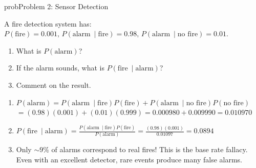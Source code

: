 \begin{PSbox}[unbreakable]{prob}{Problem 2: Sensor Detection}

A fire detection system has: $P(\text{fire}) = 0.001,\, P(\text{alarm}\ \mid \text{fire}) = 0.98,\, P(\text{alarm}\ \mid \text{no fire}) = 0.01$.

\begin{enumerate}
\def\labelenumi{(\alph{enumi})}
\tightlist
\item
  What is $P(\text{alarm})$?
\item
  If the alarm sounds, what is $P(\text{fire}\ \mid \text{alarm})$?
\item
  Comment on the result.
\end{enumerate}

\PSsolution{} 

\begin{enumerate}
\def\labelenumi{(\alph{enumi})}
\item
  $P(\text{alarm}) = P(\text{alarm}\ \mid \text{fire})P(\text{fire}) + P(\text{alarm}\ \mid \text{no fire})P(\text{no fire})$\PSbr{}$= (0.98)(0.001) + (0.01)(0.999) = 0.000980 + 0.009990 = 0.010970$
\item
  $\displaystyle P(\text{fire}\ \mid \text{alarm}) = \frac{P(\text{alarm}\ \mid \text{fire})P(\text{fire})}{P(\text{alarm})}$\PSbr{}$\displaystyle = \frac{(0.98)(0.001)}{0.01097} = 0.0894$
\item
  Only $\sim 9\%$ of alarms correspond to real fires! This is the base rate fallacy. Even with an excellent detector, rare events produce many false alarms.
\end{enumerate}

\end{PSbox}

